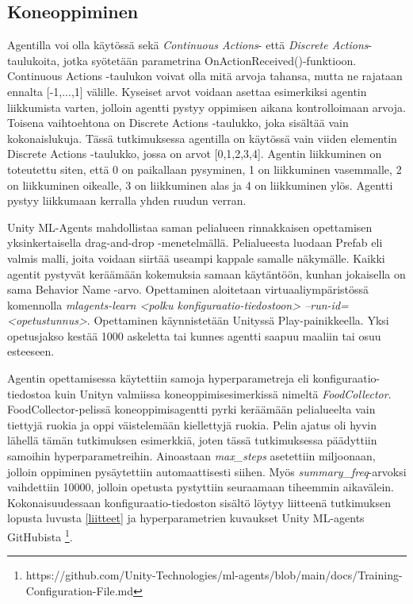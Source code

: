 \documentclass[utf8]{gradu3}
\begin{document}
\subsection{Koneoppiminen}

Agentilla voi olla käytössä sekä \textit{Continuous Actions}- että \textit{Discrete Actions}-taulukoita, jotka syötetään parametrina OnActionReceived()-funktioon. Continuous Actions -taulukon voivat olla mitä arvoja tahansa, mutta ne rajataan ennalta [-1,...,1] välille. Kyseiset arvot voidaan asettaa esimerkiksi agentin liikkumista varten, jolloin agentti pystyy oppimisen aikana kontrolloimaan arvoja. Toisena vaihtoehtona on Discrete Actions -taulukko, joka sisältää vain kokonaislukuja. Tässä tutkimuksessa agentilla on käytössä vain viiden elementin Discrete Actions -taulukko, jossa on arvot [0,1,2,3,4]. Agentin liikkuminen on toteutettu siten, että 0 on paikallaan pysyminen, 1 on liikkuminen vasemmalle, 2 on liikkuminen oikealle, 3 on liikkuminen alas ja 4 on liikkuminen ylös. Agentti pystyy liikkumaan kerralla yhden ruudun verran.

Unity ML-Agents mahdollistaa saman pelialueen rinnakkaisen opettamisen yksinkertaisella drag-and-drop -menetelmällä. Pelialueesta luodaan Prefab eli valmis malli, joita voidaan siirtää useampi kappale samalle näkymälle. Kaikki agentit pystyvät keräämään kokemuksia samaan käytäntöön, kunhan jokaisella on sama Behavior Name -arvo. Opettaminen aloitetaan virtuaaliympäristössä komennolla \textit{mlagents-learn <polku konfiguraatio-tiedostoon> --run-id=<opetustunnus>}. Opettaminen käynnistetään Unityssä Play-painikkeella. Yksi opetusjakso kestää 1000 askeletta tai kunnes agentti saapuu maaliin tai osuu esteeseen.

Agentin opettamisessa käytettiin samoja hyperparametreja eli konfiguraatio-tiedostoa kuin Unityn valmiissa koneoppimisesimerkissä nimeltä \textit{FoodCollector}. FoodCollector-pelissä koneoppimisagentti pyrki keräämään pelialueelta vain tiettyjä ruokia ja oppi väistelemään kiellettyjä ruokia. Pelin ajatus oli hyvin lähellä tämän tutkimuksen esimerkkiä, joten tässä tutkimuksessa päädyttiin samoihin hyperparametreihin. Ainoastaan \textit{max\_steps} asetettiin miljoonaan, jolloin oppiminen pysäytettiin automaattisesti siihen. Myös \textit{summary\_freq}-arvoksi vaihdettiin 10000, jolloin opetusta pystyttiin seuraamaan tiheemmin aikavälein. Kokonaisuudessaan konfiguraatio-tiedoston sisältö löytyy liitteenä tutkimuksen lopusta luvusta \ref{liitteet} ja hyperparametrien kuvaukset Unity ML-agents GitHubista \footnote{https://github.com/Unity-Technologies/ml-agents/blob/main/docs/Training-Configuration-File.md}.
\end{document}
